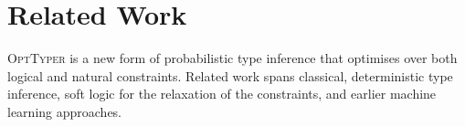 \documentclass[acmsmall, review, anonymous]{acmart}\settopmatter{printfolios=true,printccs=false,printacmref=false}
\newcommand{\projectname}{\textsc{OptTyper}\xspace}
\newcommand{\margincomment}[2]{\marginpar{\scriptsize\color{Maroon}#1 says: #2}}
\newcommand{\cas}[1]{\margincomment{Charles}{#1}}
\begin{document}



\section{Related Work}\label{sec:related}

\projectname is a new form of probabilistic type inference that optimises over
both logical and natural constraints.  Related work spans classical, deterministic
type inference, soft logic for the relaxation of the constraints, and earlier machine learning approaches.
\end{document}
